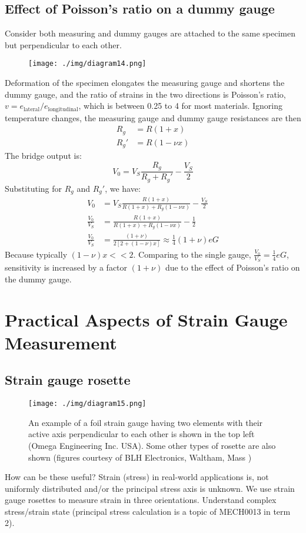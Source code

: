 \subsection{Effect of Poisson's ratio on a dummy gauge}
Consider both measuring and dummy gauges are attached to the same specimen but perpendicular to each other.
\begin{figure}[H]
  \centering
  \texttt{[image: ./img/diagram14.png]}
\end{figure}
Deformation of the specimen elongates the measuring gauge and shortens the dummy gauge, and the ratio of strains in the two directions is Poisson's ratio, $v = e_{\textrm{lateral}}/e_{\textrm{longitudinal}}$, which is between 0.25 to 4 for most materials. Ignoring temperature changes, the measuring gauge and dummy gauge resistances are then \begin{align}
  R_g  & = R(1+x)     \\
  R_g' & = R(1-\nu x)
\end{align}
The bridge output is:
\begin{equation}
  V_0 = V_S\frac{R_g}{R_g + R_g'} - \frac{V_S}{2}
\end{equation}
Substituting for $R_g$ and $R_g'$, we have:
\begin{align}
  V_0             & = V_S \frac{R(1+x)}{R(1+x) + R_g(1-\nu x)} - \frac{V_S}{2}       \\
  \frac{V_0}{V_S} & = \frac{R(1+x)}{R(1+x) + R_g(1-\nu x)} - \frac{1}{2}             \\
  \frac{V_0}{V_S} & = \frac{(1+ \nu)}{2[2+ (1-\nu)x]} \approx \frac{1}{4} (1+\nu) eG
\end{align}
Because typically $(1-\nu) x << 2$. Comparing to the single gauge, $\frac{V_0}{V_S} = \frac{1}{4}eG$, sensitivity is increased by a factor $(1+\nu)$ due to the effect of Poisson's ratio on the dummy gauge.
\section{Practical Aspects of Strain Gauge Measurement}
\subsection{Strain gauge rosette}
\begin{figure}[H]
  \centering
  \texttt{[image: ./img/diagram15.png]}
  \caption{An example of a foil strain gauge having two elements with their active axis perpendicular to each other is shown in the top left (Omega Engineering Inc. USA). Some other types of rosette are also shown (figures courtesy of BLH Electronics, Waltham, Mass )}
\end{figure}
How can be these useful? Strain (stress) in real-world applications is, not uniformly distributed and/or the principal stress axis is unknown. We use strain gauge rosettes to measure strain in three orientations. Understand complex stress/strain state (principal stress calculation is a topic of MECH0013 in term 2).
